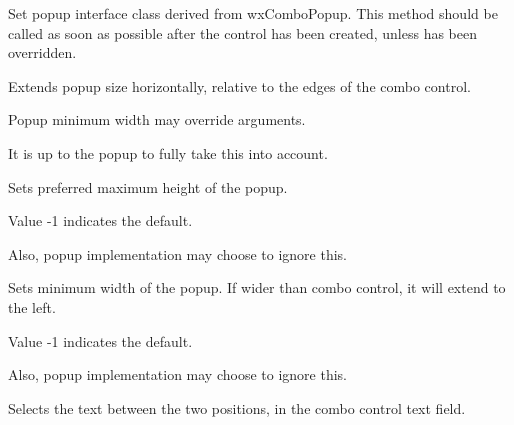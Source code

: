 Set popup interface class derived from wxComboPopup.
This method should be called as soon as possible after the control
has been created, unless 
has been overridden.


\label{wxcomboctrlsetpopupextents}


Extends popup size horizontally, relative to the edges of the combo control.




Popup minimum width may override arguments.

It is up to the popup to fully take this into account.


\label{wxcomboctrlsetpopupmaxheight}


Sets preferred maximum height of the popup.


Value -1 indicates the default.

Also, popup implementation may choose to ignore this.


\label{wxcomboctrlsetpopupminwidth}


Sets minimum width of the popup. If wider than combo control, it will extend to the left.


Value -1 indicates the default.

Also, popup implementation may choose to ignore this.


\label{wxcomboctrlsetselection}


Selects the text between the two positions, in the combo control text field.

